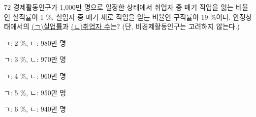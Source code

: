 \begin{question}{72}
경제활동인구가 1,000만 명으로 일정한 상태에서 취업자 중 매기 직업을 잃는 비율인 실직률이 1 \%, 실업자 중 매기 새로 직업을 얻는 비율인 구직률이 19 \%이다. 안정상태에서의 \uline{(ㄱ)실업률}과 \uline{(ㄴ)취업자 수}는? (단, 비경제활동인구는 고려하지 않는다.)
\begin{choices}
  \item ㄱ: 2 \%, ㄴ: 980만 명
  \item ㄱ: 3 \%, ㄴ: 970만 명
  \item ㄱ: 4 \%, ㄴ: 960만 명
  \item ㄱ: 5 \%, ㄴ: 950만 명
  \item ㄱ: 6 \%, ㄴ: 940만 명
\end{choices}
\end{question}
